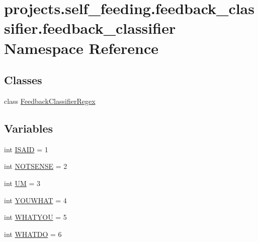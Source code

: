 \hypertarget{namespaceprojects_1_1self__feeding_1_1feedback__classifier_1_1feedback__classifier}{}\section{projects.\+self\+\_\+feeding.\+feedback\+\_\+classifier.\+feedback\+\_\+classifier Namespace Reference}
\label{namespaceprojects_1_1self__feeding_1_1feedback__classifier_1_1feedback__classifier}
\subsection*{Classes}
\begin{DoxyCompactItemize}
\item 
class \hyperlink{classprojects_1_1self__feeding_1_1feedback__classifier_1_1feedback__classifier_1_1FeedbackClassifierRegex}{Feedback\+Classifier\+Regex}
\end{DoxyCompactItemize}
\subsection*{Variables}
\begin{DoxyCompactItemize}
\item 
int \hyperlink{namespaceprojects_1_1self__feeding_1_1feedback__classifier_1_1feedback__classifier_a248d2e13bc5419c204131db0872d0e5c}{I\+S\+A\+ID} = 1
\item 
int \hyperlink{namespaceprojects_1_1self__feeding_1_1feedback__classifier_1_1feedback__classifier_aca48568adc0dfa68dfb1ebc530e0f3f0}{N\+O\+T\+S\+E\+N\+SE} = 2
\item 
int \hyperlink{namespaceprojects_1_1self__feeding_1_1feedback__classifier_1_1feedback__classifier_afca9b57c785551b23c2687749e1c4f76}{UM} = 3
\item 
int \hyperlink{namespaceprojects_1_1self__feeding_1_1feedback__classifier_1_1feedback__classifier_a1d0589e4c9a17fb9ff48aed699a5c3d4}{Y\+O\+U\+W\+H\+AT} = 4
\item 
int \hyperlink{namespaceprojects_1_1self__feeding_1_1feedback__classifier_1_1feedback__classifier_a10ec8476336604c47a1b24234d260232}{W\+H\+A\+T\+Y\+OU} = 5
\item 
int \hyperlink{namespaceprojects_1_1self__feeding_1_1feedback__classifier_1_1feedback__classifier_a2472142ca7ed41281cc2d91beadc8780}{W\+H\+A\+T\+DO} = 6
\end{DoxyCompactItemize}


